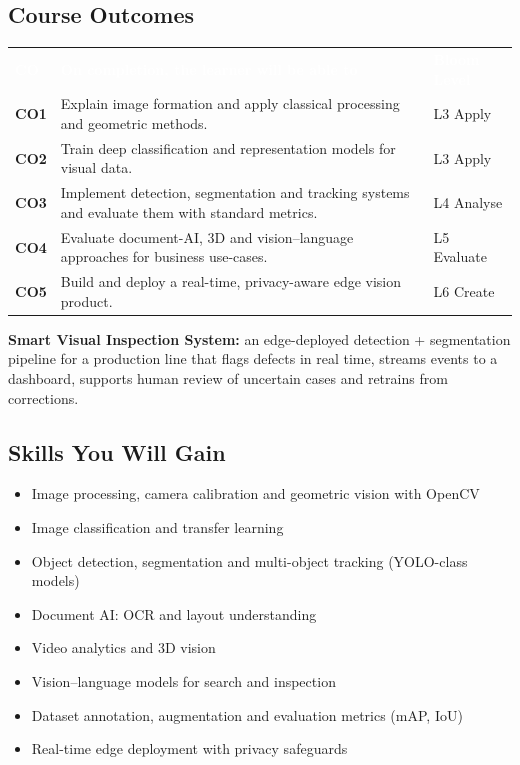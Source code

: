 \documentclass[10pt,a4paper]{article}
\newcommand{\hdr}{\rowcolor{navy}}
\newcommand{\hw}[1]{\textcolor{white}{\bfseries #1}}
\begin{document}
\subsection*{Course Outcomes}
\par{\small\begin{tabularx}{\linewidth}{@{}>{\bfseries}p{0.9cm}Y>{\raggedright\arraybackslash}p{2.3cm}@{}}\hdr\hw{CO}&\hw{On completion, the learner will be able to}&\hw{Bloom Level}\\
CO1 & Explain image formation and apply classical processing and geometric methods. & L3 Apply\\
CO2 & Train deep classification and representation models for visual data. & L3 Apply\\
CO3 & Implement detection, segmentation and tracking systems and evaluate them with standard metrics. & L4 Analyse\\
CO4 & Evaluate document-AI, 3D and vision–language approaches for business use-cases. & L5 Evaluate\\
CO5 & Build and deploy a real-time, privacy-aware edge vision product. & L6 Create\\
\bottomrule\end{tabularx}}
\begin{tcolorbox}[colback=goldbg,colframe=goldl,boxrule=0.7pt,arc=2pt,title={Enterprise Capstone Product},colbacktitle=goldl!35,coltitle=navy,fonttitle=\small\bfseries]\small\textbf{Smart Visual Inspection System:} an edge-deployed detection + segmentation pipeline for a production line that flags defects in real time, streams events to a dashboard, supports human review of uncertain cases and retrains from corrections.\end{tcolorbox}
\subsection*{Skills You Will Gain}\begin{multicols}{2}\begin{itemize}\small
\item Image processing, camera calibration and geometric vision with OpenCV
\item Image classification and transfer learning
\item Object detection, segmentation and multi-object tracking (YOLO-class models)
\item Document AI: OCR and layout understanding
\item Video analytics and 3D vision
\item Vision–language models for search and inspection
\item Dataset annotation, augmentation and evaluation metrics (mAP, IoU)
\item Real-time edge deployment with privacy safeguards
\end{itemize}\end{multicols}
\end{document}
